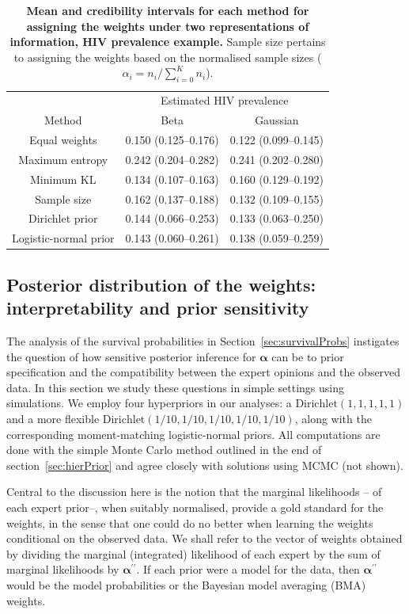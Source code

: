 \documentclass[a4paper, notitlepage, 11pt]{article}
\begin{document}
\begin{table}[ht]
\caption{\textbf{Mean and credibility intervals for each method for assigning the weights under two representations of information, HIV prevalence example.}
Sample size pertains to assigning the  weights based on the normalised sample sizes ($\alpha_i = n_i/ \sum_{i =0}^K n_i$).
}
\centering
\begin{tabular}{ccc}
 \hline
 & \multicolumn{2}{c}{Estimated HIV prevalence} \\
Method & Beta & Gaussian  \\ 
 \hline
 Equal weights &  0.150 (0.125--0.176)&  0.122 (0.099--0.145)\\ 
 Maximum entropy & 0.242 (0.204--0.282)  &  0.241 (0.202--0.280)\\ 
 Minimum KL  & 0.134 (0.107--0.163)  & 0.160 (0.129--0.192) \\ 
 Sample size & 0.162 (0.137--0.188) & 0.132 (0.109--0.155)\\
 Dirichlet prior & 0.144 (0.066--0.253) &  0.133 (0.063--0.250)\\ 
 Logistic-normal prior  & 0.143 (0.060--0.261) & 0.138 (0.059--0.259)\\ 
  \hline
\end{tabular}
\label{tab:prior_MSM}
\end{table}

\subsection{Posterior distribution of the weights: interpretability and prior sensitivity}
\label{sec:learning_rate}

The analysis of the survival probabilities in Section~\ref{sec:survivalProbs} instigates the question of how sensitive posterior inference for $\boldsymbol \alpha$ can be to prior specification and the compatibility between the expert opinions and the observed data.
In this section we study these questions in simple settings using simulations.
We employ four hyperpriors in our analyses: a $\text{Dirichlet}(1, 1, 1, 1, 1)$ and a more flexible $\text{Dirichlet}(1/10, 1/10, 1/10, 1/10, 1/10)$, along with the corresponding moment-matching logistic-normal priors.
All computations are done with the simple Monte Carlo method outlined in the end of section~\ref{sec:hierPrior} and agree closely with solutions using MCMC (not shown).

Central to the discussion here is the notion that the marginal likelihoods -- of each expert prior--, when suitably normalised, provide a gold standard for the weights, in the sense that one could do no better when learning the weights conditional on the observed data.
We shall refer to the vector of weights obtained by dividing the marginal (integrated) likelihood of each expert by the sum of marginal likelihoods by $\boldsymbol\alpha^{\prime\prime}$.
If each prior were a model for the data, then $\boldsymbol\alpha^{\prime\prime}$ would be the model probabilities or the Bayesian model averaging (BMA) weights.
\end{document}
